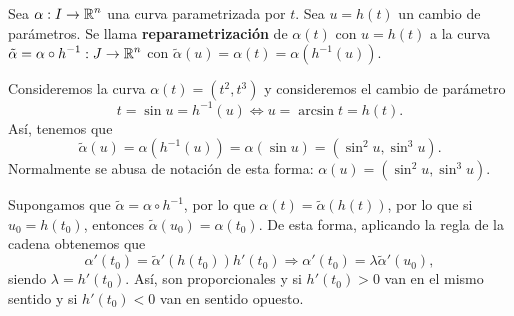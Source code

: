 \begin{definition}[Reparametrización]
	Sea $\displaystyle \alpha : I \to \mathbb{R}^{n} $ una curva parametrizada por $\displaystyle t $. Sea $\displaystyle u = h\left(t\right) $ un cambio de parámetros. Se llama \textbf{reparametrización} de $\displaystyle \alpha \left(t\right) $ con $\displaystyle u = h\left(t\right) $ a la curva $\displaystyle \tilde{\alpha} = \alpha \circ h^{-1} : J \to \mathbb{R}^{n} $ con $\displaystyle \tilde{\alpha}\left(u\right)=\alpha\left(t\right)=\alpha\left(h^{-1}\left(u\right)\right) $.
\end{definition}
\begin{eg}
Consideremos la curva $\displaystyle \alpha \left(t\right)=\left(t ^{2}, t ^{3}\right) $ y consideremos el cambio de parámetro 
\[t = \sin u = h^{-1}\left(u\right) \iff u = \arcsin t = h\left(t\right) .\]
Así, tenemos que 
\[\tilde{\alpha}\left(u\right)=\alpha\left(h^{-1}\left(u\right)\right)=\alpha\left(\sin u\right)=\left(\sin ^{2}u, \sin ^{3}u\right) .\]
Normalmente se abusa de notación de esta forma: $\displaystyle \alpha\left(u\right)=\left(\sin ^{2}u, \sin ^{3}u\right) $. 
\end{eg}
\begin{observation}
 Supongamos que $\displaystyle \tilde{\alpha} = \alpha \circ h^{-1} $, por lo que $\displaystyle \alpha\left(t\right)=\tilde{\alpha}\left(h\left(t\right)\right) $, por lo que si $\displaystyle u_{0}=h\left(t_{0}\right) $, entonces $\displaystyle \tilde{\alpha}\left(u_{0}\right)=\alpha\left(t_{0}\right) $. De esta forma, aplicando la regla de la cadena obtenemos que 
		\[\alpha'\left(t_{0}\right)=\tilde{\alpha}'\left(h\left(t_{0}\right)\right)h'\left(t_{0}\right) \Rightarrow \alpha'\left(t_{0}\right)=\lambda \tilde{\alpha}'\left(u_{0}\right) ,\]
	siendo $\displaystyle \lambda = h'\left(t_{0}\right) $. Así, son proporcionales y si $\displaystyle h'\left(t_{0}\right)>0 $ van en el mismo sentido y si $\displaystyle h'\left(t_{0}\right)<0 $ van en sentido opuesto. 
\end{observation}
